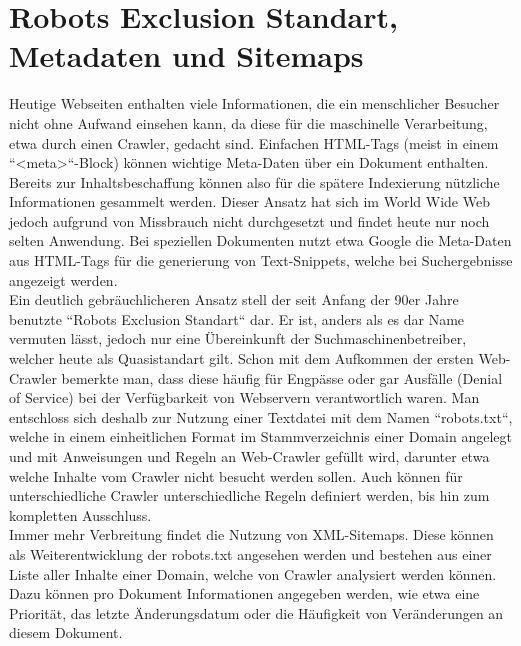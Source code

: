 \section{Robots Exclusion Standart, Metadaten und Sitemaps}
Heutige Webseiten enthalten viele Informationen, die ein menschlicher Besucher nicht ohne Aufwand einsehen kann, da diese für die maschinelle Verarbeitung, etwa durch einen Crawler, gedacht sind. Einfachen HTML-Tags (meist in einem ``<meta>``-Block) können wichtige Meta-Daten über ein Dokument enthalten. Bereits zur Inhaltsbeschaffung können also für die spätere Indexierung nützliche Informationen gesammelt werden. Dieser Ansatz hat sich im World Wide Web jedoch aufgrund von Missbrauch nicht durchgesetzt und findet heute nur noch selten Anwendung. Bei speziellen Dokumenten nutzt etwa Google die Meta-Daten aus HTML-Tags für die generierung von Text-Snippets, welche bei Suchergebnisse angezeigt werden.\\
Ein deutlich gebräuchlicheren Ansatz stell der seit Anfang der 90er Jahre benutzte ``Robots Exclusion Standart`` dar. Er ist, anders als es dar Name vermuten lässt, jedoch nur eine Übereinkunft der Suchmaschinenbetreiber, welcher heute als Quasistandart gilt. Schon mit dem Aufkommen der ersten Web-Crawler bemerkte man, dass diese häufig für Engpässe oder gar Ausfälle (Denial of Service) bei der Verfügbarkeit von Webservern verantwortlich waren. Man entschloss sich deshalb zur Nutzung einer Textdatei mit dem Namen ``robots.txt``, welche in einem einheitlichen Format im Stammverzeichnis einer Domain angelegt und mit Anweisungen und Regeln an Web-Crawler gefüllt wird, darunter etwa welche Inhalte vom Crawler nicht besucht werden sollen. Auch können für unterschiedliche Crawler unterschiedliche Regeln definiert werden, bis hin zum kompletten Ausschluss.\\
Immer mehr Verbreitung findet die Nutzung von XML-Sitemaps. Diese können als Weiterentwicklung der robots.txt angesehen werden und bestehen aus einer Liste aller Inhalte einer Domain, welche von Crawler analysiert werden können. Dazu können pro Dokument Informationen angegeben werden, wie etwa eine Priorität, das letzte Änderungsdatum oder die Häufigkeit von Veränderungen an diesem Dokument.\\
